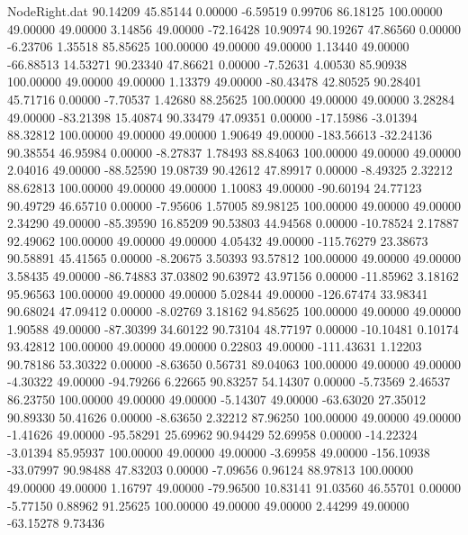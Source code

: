 \begin{filecontents}{NodeRight.dat}
  90.14209   45.85144    0.00000    -6.59519    0.99706   86.18125  100.00000   49.00000   49.00000    3.14856   49.00000  -72.16428   10.90974
  90.19267   47.86560    0.00000    -6.23706    1.35518   85.85625  100.00000   49.00000   49.00000    1.13440   49.00000  -66.88513   14.53271
  90.23340   47.86621    0.00000    -7.52631    4.00530   85.90938  100.00000   49.00000   49.00000    1.13379   49.00000  -80.43478   42.80525
  90.28401   45.71716    0.00000    -7.70537    1.42680   88.25625  100.00000   49.00000   49.00000    3.28284   49.00000  -83.21398   15.40874
  90.33479   47.09351    0.00000   -17.15986   -3.01394   88.32812  100.00000   49.00000   49.00000    1.90649   49.00000 -183.56613  -32.24136
  90.38554   46.95984    0.00000    -8.27837    1.78493   88.84063  100.00000   49.00000   49.00000    2.04016   49.00000  -88.52590   19.08739
  90.42612   47.89917    0.00000    -8.49325    2.32212   88.62813  100.00000   49.00000   49.00000    1.10083   49.00000  -90.60194   24.77123
  90.49729   46.65710    0.00000    -7.95606    1.57005   89.98125  100.00000   49.00000   49.00000    2.34290   49.00000  -85.39590   16.85209
  90.53803   44.94568    0.00000   -10.78524    2.17887   92.49062  100.00000   49.00000   49.00000    4.05432   49.00000 -115.76279   23.38673
  90.58891   45.41565    0.00000    -8.20675    3.50393   93.57812  100.00000   49.00000   49.00000    3.58435   49.00000  -86.74883   37.03802
  90.63972   43.97156    0.00000   -11.85962    3.18162   95.96563  100.00000   49.00000   49.00000    5.02844   49.00000 -126.67474   33.98341
  90.68024   47.09412    0.00000    -8.02769    3.18162   94.85625  100.00000   49.00000   49.00000    1.90588   49.00000  -87.30399   34.60122
  90.73104   48.77197    0.00000   -10.10481    0.10174   93.42812  100.00000   49.00000   49.00000    0.22803   49.00000 -111.43631    1.12203
  90.78186   53.30322    0.00000    -8.63650    0.56731   89.04063  100.00000   49.00000   49.00000   -4.30322   49.00000  -94.79266    6.22665
  90.83257   54.14307    0.00000    -5.73569    2.46537   86.23750  100.00000   49.00000   49.00000   -5.14307   49.00000  -63.63020   27.35012
  90.89330   50.41626    0.00000    -8.63650    2.32212   87.96250  100.00000   49.00000   49.00000   -1.41626   49.00000  -95.58291   25.69962
  90.94429   52.69958    0.00000   -14.22324   -3.01394   85.95937  100.00000   49.00000   49.00000   -3.69958   49.00000 -156.10938  -33.07997
  90.98488   47.83203    0.00000    -7.09656    0.96124   88.97813  100.00000   49.00000   49.00000    1.16797   49.00000  -79.96500   10.83141
  91.03560   46.55701    0.00000    -5.77150    0.88962   91.25625  100.00000   49.00000   49.00000    2.44299   49.00000  -63.15278    9.73436

\end{filecontents}
